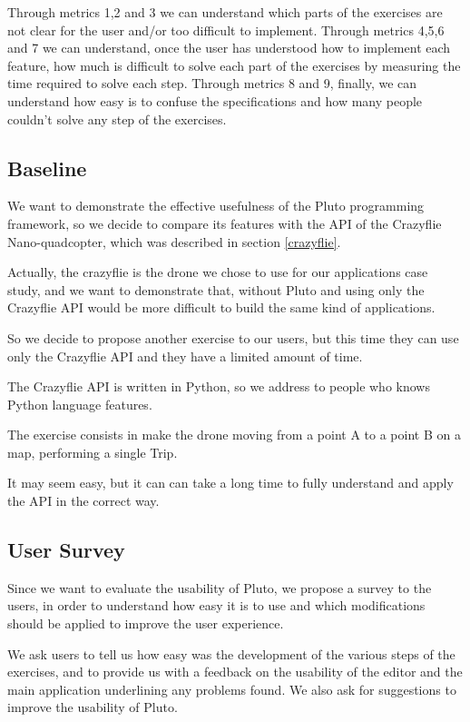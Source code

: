 Through metrics 1,2 and 3 we can understand which parts of the exercises are not clear for the user and/or too difficult to implement. 
Through metrics 4,5,6 and 7 we can understand, once the user has understood how to implement each feature, how much is difficult to solve each part of the exercises by measuring the time required to solve each step.
Through metrics 8 and 9, finally, we can understand how easy is to confuse the specifications and how many people couldn't solve any step of the exercises.


\subsection{Baseline}

We want to demonstrate the effective usefulness of the Pluto programming framework, so we decide to compare its features with the API of the Crazyflie Nano-quadcopter, which was described in section \ref{crazyflie}.

Actually, the crazyflie is the drone we chose to use for our applications case study, and we want to demonstrate that, without Pluto and using only the Crazyflie API would be more difficult to build the same kind of applications.

So we decide to propose another exercise to our users, but this time they can use only the Crazyflie API and they have a limited amount of time.

The Crazyflie API is written in Python, so we address to people who knows Python language features.

The exercise consists in make the drone moving from a point A to a point B on a map, performing a single Trip.

It may seem easy, but it can can take a long time to fully understand and apply the API in the correct way.


\subsection{User Survey}\label{survey}

Since we want to evaluate the usability of Pluto, we propose a survey to the users, in order to understand how easy it is to use and which modifications should be applied to improve the user experience.

We ask users to tell us how easy was the development of the various steps of the exercises, and to provide us with a feedback on the usability of the editor and the main application underlining any problems found.
We also ask for suggestions to improve the usability of Pluto.

